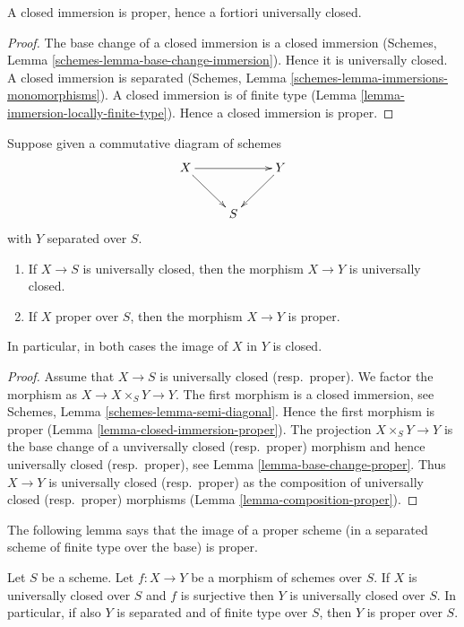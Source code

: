 \begin{lemma}
\label{lemma-closed-immersion-proper}
A closed immersion is proper, hence a fortiori universally closed.
\end{lemma}

\begin{proof}
The base change of a closed immersion is a closed immersion
(Schemes, Lemma \ref{schemes-lemma-base-change-immersion}).
Hence it is universally closed.
A closed immersion is separated
(Schemes, Lemma \ref{schemes-lemma-immersions-monomorphisms}).
A closed immersion is of finite type
(Lemma \ref{lemma-immersion-locally-finite-type}).
Hence a closed immersion is proper.
\end{proof}

\begin{lemma}
\label{lemma-image-proper-scheme-closed}
Suppose given a commutative diagram of schemes
$$
\xymatrix{
X \ar[rr] \ar[rd] & &
Y \ar[ld] \\
& S &
}
$$
with $Y$ separated over $S$.
\begin{enumerate}
\item If $X \to S$ is universally closed, then the morphism
$X \to Y$ is universally closed.
\item If $X$ proper over $S$, then the morphism $X \to Y$ is proper.
\end{enumerate}
In particular, in both cases the image of $X$ in $Y$ is closed.
\end{lemma}

\begin{proof}
Assume that $X \to S$ is universally closed (resp.\ proper).
We factor the morphism as $X \to X \times_S Y \to Y$.
The first morphism is a closed immersion, see
Schemes, Lemma \ref{schemes-lemma-semi-diagonal}.
Hence the first morphism is proper (Lemma \ref{lemma-closed-immersion-proper}).
The projection $X \times_S Y \to Y$ is the base change
of a unviversally closed (resp.\ proper) morphism and hence
universally closed (resp.\ proper), see Lemma \ref{lemma-base-change-proper}.
Thus $X \to Y$ is universally closed (resp.\ proper) as the composition
of universally closed (resp.\ proper) morphisms
(Lemma \ref{lemma-composition-proper}).
\end{proof}

\noindent
The following lemma says that the image of a proper scheme (in a separated
scheme of finite type over the base) is proper.

\begin{lemma}
\label{lemma-image-proper-is-proper}
Let $S$ be a scheme.
Let $f : X \to Y$ be a morphism of schemes over $S$.
If $X$ is universally closed over $S$ and $f$ is surjective then
$Y$ is universally closed over $S$. In particular, if also $Y$ is
separated and of finite type over $S$, then $Y$ is proper over $S$.
\end{lemma}

